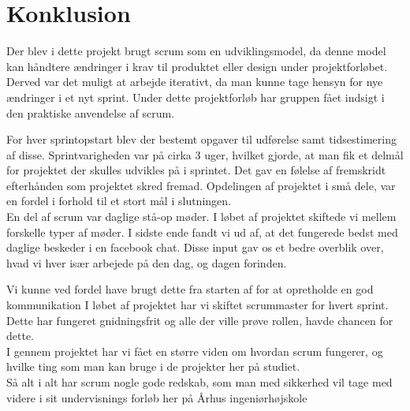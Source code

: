 \chapter{Konklusion}
Der blev i dette projekt brugt scrum som en udviklingsmodel, da denne model kan håndtere ændringer i krav til produktet eller design under projektforløbet. Derved var det muligt at arbejde iterativt, da man kunne tage hensyn for nye ændringer i et nyt sprint. \newline
\noindent Under dette projektforløb har gruppen fået indsigt i den praktiske anvendelse af scrum. 

 \noindent For hver sprintopstart blev der bestemt opgaver til udførelse samt tidsestimering af disse. Sprintvarigheden var på cirka 3 uger, hvilket gjorde, at man fik et delmål for projektet der skulles udvikles på i sprintet. Det gav en følelse af fremskridt efterhånden som projektet skred fremad. Opdelingen af projektet i små dele, var en fordel i forhold til et stort mål i slutningen. \\
 
 \noindent En del af scrum var daglige stå-op møder. I løbet af projektet skiftede vi mellem forskelle typer af møder. I sidste ende fandt vi ud af, at det fungerede bedst med daglige beskeder i en facebook chat. Disse input gav os et bedre overblik over, hvad vi hver især arbejede på den dag, og dagen forinden.
  
 \noindent Vi kunne ved fordel have brugt dette fra starten af for at opretholde en god kommunikation
 I løbet af projektet har vi skiftet scrummaster for hvert sprint. Dette har fungeret gnidningsfrit og alle der ville prøve rollen, havde chancen for dette. \\
 
 \noindent I gennem projektet har vi fået en større viden om hvordan scrum fungerer, og hvilke ting som man kan bruge i de projekter her på studiet. 
\\Så alt i alt har scrum nogle gode redskab, som man med sikkerhed vil tage med videre i sit undervisnings forløb her på Århus ingeniørhøjskole 
 



 



